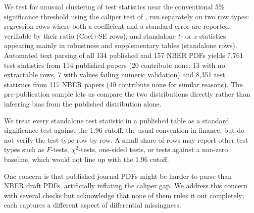 \documentclass[12pt]{article}
\begin{document}
We test for unusual clustering of test statistics near the
conventional 5\% significance threshold using the caliper test of
\citet*{Brodeur2016}, run separately on two row types: regression rows
where both a coefficient and a standard error are reported,
verifiable by their ratio (Coef+SE rows), and standalone $t$- or
$z$-statistics appearing mainly in robustness and supplementary
tables (standalone rows).  Automated text
parsing of all 134 published and 157 NBER PDFs yields 7,761 test
statistics from 114 published papers (20 contribute none: 13 with no
extractable rows, 7 with values failing numeric validation) and 8,351
test statistics from 117 NBER papers (40 contribute none for similar
reasons).  The pre-publication sample lets us compare the two
distributions directly rather than inferring bias from the published
distribution alone.

We treat every standalone test statistic in a published table as a
standard significance test against the 1.96 cutoff, the usual
convention in finance, but do not verify the test type row by row.
A small share of rows may report other test types such as $F$-tests,
$\chi^2$-tests, one-sided tests, or tests against a non-zero
baseline, which would not line up with the 1.96 cutoff.

One concern is that published journal PDFs might be harder to parse than
NBER draft PDFs, artificially inflating the caliper gap.  We address this
concern with several checks but acknowledge that none of them rules it
out completely; each captures a different aspect of differential
missingness.
\end{document}
